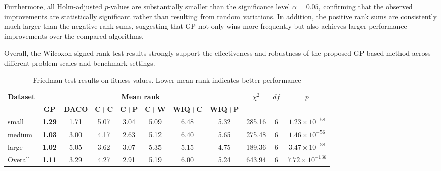 \documentclass[pdflatex]{sn-jnl}
\begin{document}
Furthermore, all Holm-adjusted $p$-values are substantially smaller than the significance level $\alpha = 0.05$, confirming that the observed improvements are statistically significant rather than resulting from random variations. In addition, the positive rank sums are consistently much larger than the negative rank sums, suggesting that GP not only wins more frequently but also achieves larger performance improvements over the compared algorithms.

Overall, the Wilcoxon signed-rank test results strongly support the effectiveness and robustness of the proposed GP-based method across different problem scales and benchmark settings.

\begin{table}[ht]
\centering
\caption{Friedman test results on fitness values. Lower mean rank indicates better performance}
\label{tab:friedman}
\scriptsize
\begin{tabular}{lcccccccccc}
\hline
\multirow{2}{*}{\textbf{Dataset}} &
\multicolumn{7}{c}{\textbf{Mean rank}} &
\multirow{2}{*}{$\chi^2$} &
\multirow{2}{*}{$df$} &
\multirow{2}{*}{$p$} \\
\cmidrule(lr){2-8}
& \textbf{GP} & \textbf{DACO} & \textbf{C+C} & \textbf{C+P} & \textbf{C+W} & \textbf{WIQ+C} & \textbf{WIQ+P} & & & \\
\hline
small &
\textbf{1.29} & 1.71 & 5.07 & 3.04 & 5.09 & 6.48 & 5.32 &
285.16 & 6 & $1.23 \times 10^{-58}$ \\

medium &
\textbf{1.03} & 3.00 & 4.17 & 2.63 & 5.12 & 6.40 & 5.65 &
275.48 & 6 & $1.46 \times 10^{-56}$ \\

large &
\textbf{1.02} & 5.05 & 3.62 & 3.07 & 5.35 & 5.15 & 4.75 &
189.36 & 6 & $3.47 \times 10^{-38}$ \\

\hline
Overall &
\textbf{1.11} & 3.29 & 4.27 & 2.91 & 5.19 & 6.00 & 5.24 &
643.94 & 6 & $7.72 \times 10^{-136}$ \\
\hline
\end{tabular}%
\end{table}
\end{document}
